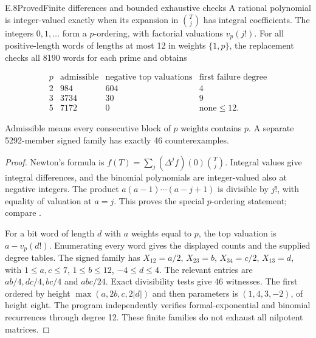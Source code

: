 \begin{statement}{E.8}{Proved}{Finite differences and bounded exhaustive checks}
A rational polynomial is integer-valued exactly when
its expansion in $\binom Tj$ has integral coefficients.
The integers $0,1,\ldots$ form a $p$-ordering, with
factorial valuations $v_p(j!)$.
For all positive-length words of lengths at most 12
in weights $\{1,p\}$, the replacement checks all 8190
words for each prime and obtains

$$
\begin{array}{c|rrr}
p&\text{admissible}&\text{negative top valuations}&
\text{first failure degree}\\\hline
2&984&604&4\\3&3734&30&9\\5&7172&0&\text{none}\le12.
\end{array}
$$

Admissible means every consecutive block of $p$ weights
contains $p$. A separate 5292-member signed family
has exactly 46 counterexamples.
\end{statement}
\begin{proof}
Newton's formula is
$f(T)=\sum_j(\Delta^jf)(0)\binom Tj$.
Integral values give integral differences, and the binomial
polynomials are integer-valued also at negative integers.
The product $a(a-1)\cdots(a-j+1)$ is divisible by $j!$,
with equality of valuation at $a=j$.
This proves the special $p$-ordering statement; compare
\cite[Theorem 2, equation (1)]{E_Bhargava2009}.

For a bit word of length $d$ with $a$ weights equal to $p$,
the top valuation is $a-v_p(d!)$. Enumerating every word
gives the displayed counts and the supplied degree tables.
The signed family has
$X_{12}=a/2$, $X_{23}=b$, $X_{34}=c/2$, $X_{13}=d$,
with $1\le a,c\le7$, $1\le b\le12$, $-4\le d\le4$.
The relevant entries are $ab/4,dc/4,bc/4$ and $abc/24$.
Exact divisibility tests give 46 witnesses.
The first ordered by height $\max(a,2b,c,2|d|)$ and
then parameters is $(1,4,3,-2)$, of height eight.
The program independently verifies formal-exponential
and binomial recurrences through degree 12.
These finite families do not exhaust all nilpotent matrices.
\end{proof}

